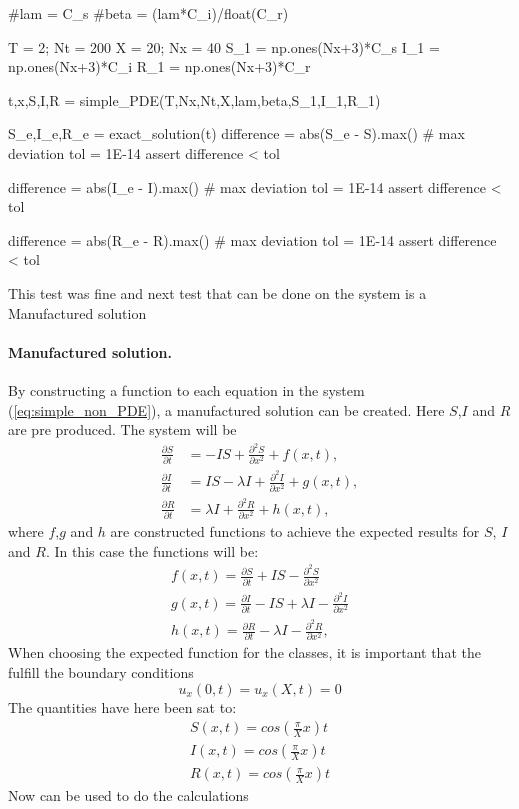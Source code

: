 \documentclass[%
twoside,                 %
final,                   %
10pt]{article}
\begin{document}
    #lam = C_s
    #beta = (lam*C_i)/float(C_r)
    
    T = 2; Nt = 200
    X = 20; Nx = 40
    S_1 = np.ones(Nx+3)*C_s
    I_1 = np.ones(Nx+3)*C_i
    R_1 = np.ones(Nx+3)*C_r
    
    t,x,S,I,R = simple_PDE(T,Nx,Nt,X,lam,beta,S_1,I_1,R_1)
    
    S_e,I_e,R_e = exact_solution(t)
    difference = abs(S_e - S).max()  # max deviation
    tol = 1E-14
    assert difference < tol

    difference = abs(I_e - I).max()  # max deviation
    tol = 1E-14
    assert difference < tol

    difference = abs(R_e - R).max()  # max deviation
    tol = 1E-14
    assert difference < tol
\epycod

This test was fine and next test that can be done on the system is a Manufactured solution
\paragraph{Manufactured solution.}
By constructing a function to each equation in the system (\ref{eq:simple_non_PDE}), a manufactured solution can be created. Here $S$,$I$ and $R$ are pre produced. The system will be
\begin{equation} \label{eq:simple_non_PDE2}
	\begin{aligned}
	\frac{\partial S}{\partial t} &= -IS + \frac{\partial^2 S}{\partial x^2}+f(x,t),\\
	\frac{\partial I}{\partial t} &= IS- \lambda I + \frac{\partial^2 I}{\partial x^2}+g(x,t),\\
	\frac{\partial R}{\partial t} &= \lambda I + \frac{\partial^2 R}{\partial x^2}+h(x,t),
	\end{aligned}
\end{equation}
where $f$,$g$ and $h$ are constructed functions to achieve the expected results for $S$, $I$ and $R$. In this case the functions will be:
\begin{equation}
	\begin{aligned}
	f(x,t) = \frac{\partial S}{\partial t} + IS - \frac{\partial^2 S}{\partial x^2}\\
	g(x,t) = \frac{\partial I}{\partial t} - IS + \lambda I - \frac{\partial^2 I}{\partial x^2}\\
	h(x,t) = \frac{\partial R}{\partial t} -\lambda I - \frac{\partial^2 R}{\partial x^2},
	\end{aligned}
\end{equation}
When choosing the expected function for the classes, it is important that the fulfill the boundary conditions
\begin{equation}
    u_x(0,t) = u_x(X,t) = 0
\end{equation}
The quantities have here been sat to:
\begin{equation}
	\begin{aligned}
    S(x,t) = cos(\frac{\pi}{X}x)t\\
    I(x,t) = cos(\frac{\pi}{X}x)t\\
    R(x,t) = cos(\frac{\pi}{X}x)t
	\end{aligned}
\end{equation}
Now  can be used to do the calculations
\end{document}
